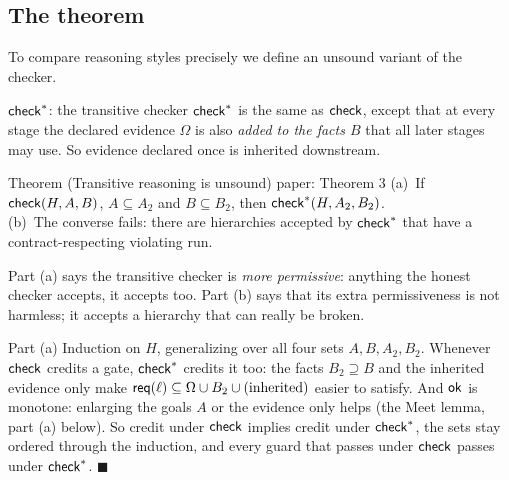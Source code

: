 \subsection{The theorem}

To compare reasoning styles precisely we define an unsound variant of the checker.

\begin{defbox}{$\mathsf{check}^{*}$: the transitive checker}
$\mathsf{check}^{*}$ is the same as $\mathsf{check}$, except that at every stage the declared evidence $\Omega$ is also \emph{added to the facts $B$} that all later stages may use. So evidence declared once is inherited downstream.
\end{defbox}

\begin{statement}{Theorem (Transitive reasoning is unsound) \hfill\normalfont paper: Theorem 3}
(a)~If $\mathsf{check}(H,A,B)$, $A\subseteq A_2$ and $B\subseteq B_2$, then $\mathsf{check}^{*}(H,A_2,B_2)$.\\
(b)~The converse fails: there are hierarchies accepted by $\mathsf{check}^{*}$ that have a contract-respecting violating run.
\end{statement}

Part (a) says the transitive checker is \emph{more permissive}: anything the honest checker accepts, it accepts too. Part (b) says that its extra permissiveness is not harmless; it accepts a hierarchy that can really be broken.

\begin{plainproof}{Part (a)}
Induction on $H$, generalizing over all four sets $A,B,A_2,B_2$. Whenever $\mathsf{check}$ credits a gate, $\mathsf{check}^{*}$ credits it too: the facts $B_2\supseteq B$ and the inherited evidence only make $\mathsf{req}(\ell)\subseteq\Omega\cup B_2\cup\text{(inherited)}$ easier to satisfy. And $\mathsf{ok}$ is monotone: enlarging the goals $A$ or the evidence only helps (the Meet lemma, part (a) below). So credit under $\mathsf{check}$ implies credit under $\mathsf{check}^{*}$, the sets stay ordered through the induction, and every guard that passes under $\mathsf{check}$ passes under $\mathsf{check}^{*}$. \hfill$\blacksquare$
\end{plainproof}


